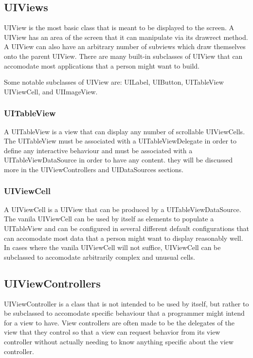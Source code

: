 \documentclass[se]{uw-wkrpt}
\begin{document}
\subsection{UIViews}

UIView is the most basic class that is meant to be displayed to
the screen. A UIView has an area of the screen that it can manipulate
via its drawrect method. A UIView can also have an arbitrary number of 
subviews which draw themselves onto the parent UIView. There are 
many built-in subclasses of UIView that can accomodate most 
applications that a person might want to build.

Some notable subclasses of UIView are: UILabel, UIButton, UITableView
UIViewCell, and UIImageView.

\subsubsection{UITableView}

A UITableView is a view that can display any number of scrollable 
UIViewCells. The UITableView must be associated with a UITableViewDelegate
in order to define any interactive behaviour and must be associated
with a UITableViewDataSource in order to have any content. they will be
discussed more in the UIViewControllers and UIDataSources sections.

\subsubsection{UIViewCell}

A UIViewCell is a UIView that can be produced by a UITableViewDataSource.
The vanila UIViewCell can be used by itself as elements to populate a
UITableView and can be configured in several different default configurations
that can accomodate most data that a person might want to display reasonably
well. In cases where the vanila UIViewCell will not suffice, UIViewCell can
be subclassed to accomodate arbitrarily complex and unusual cells.

\subsection{UIViewControllers}

UIViewController is a class that is not intended to be used by itself, 
but rather to be subclassed to accomodate specific behaviour that
a programmer might intend for a view to have. View controllers are
often made to be the delegates of the view that they control so that
a view can request behavior from its view controller without actually
needing to know anything specific about the view controller. 
\end{document}

